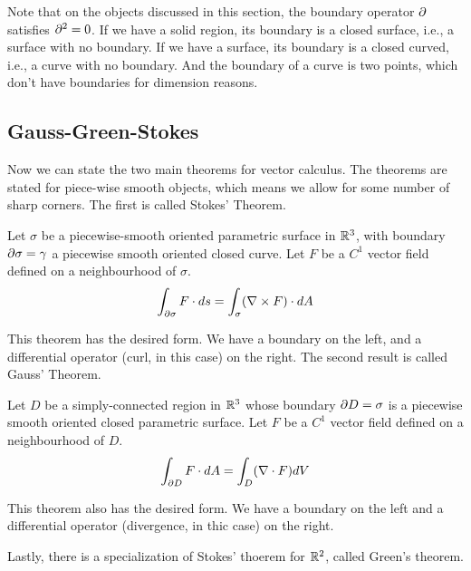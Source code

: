 \documentclass[fleqn,letterpaper]{report}
\begin{document}
Note that on the objects discussed in this section, the
boundary operator $\partial$ satisfies $\partial^2 = 0$. If we have a
solid region, its boundary is a closed surface, i.e., a
surface with no boundary. If we have a surface, its boundary
is a closed curved, i.e., a curve with no boundary. And the
boundary of a curve is two points, which don't have boundaries
for dimension reasons. 

\subsection{Gauss-Green-Stokes}
\label{gauss-green-stokes}

Now we can state the two main theorems for vector calculus.
The theorems are stated for piece-wise smooth objects, which
means we allow for some number of sharp corners.
The first is called Stokes' Theorem. 

\begin{thm}
Let $\sigma$ be a piecewise-smooth oriented parametric
surface in $\mathbb{R}^3$, with boundary $\partial \sigma = \gamma$ a
piecewise smooth oriented closed curve. Let $F$ be a $C^1$
vector field defined on a neighbourhood of $\sigma $. 
\begin{equation*}
\int_{\partial \sigma} F \cdot ds = \int_\sigma (\nabla \times F)
\cdot dA
\end{equation*}
\end{thm} 

This theorem has the desired form. We have a boundary on the left,
and a differential operator (curl, in this case) on the right.
The second result is called Gauss' Theorem.

\begin{thm}
Let $D$ be a simply-connected region in $\mathbb{R}^3$ whose boundary
$\partial D = \sigma$ is a piecewise smooth oriented closed
parametric surface. Let $F$ be a $C^1$ vector field defined on
a neighbourhood of $D$. 
\begin{equation*}
\int_{\partial D} F \cdot dA = \int_D (\nabla \cdot F) dV
\end{equation*}
\end{thm}

This theorem also has the desired form. We have a boundary on the
left and a differential operator (divergence, in thic case) on
the right. 

Lastly, there is a specialization of Stokes' thoerem
for $\mathbb{R}^2$, called Green's theorem.
\end{document}
